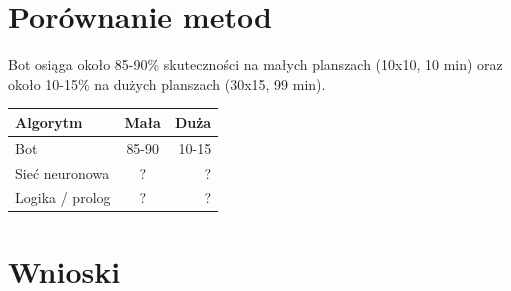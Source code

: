 \documentclass{article} %
\begin{document}
\section{Porównanie metod}
Bot osiąga około 85-90\% skuteczności na małych planszach (10x10, 10 min) 
oraz około 10-15\% na dużych planszach (30x15, 99 min).
\begin{center} 
    \begin{tabular}  { | l | c | r |   }
        \hline
        Algorytm & Mała & Duża  \\
        \hline
        Bot & 85-90 & 10-15 \\
        \hline
        Sieć neuronowa & ? & ? \\
        \hline
        Logika / prolog & ? & ? \\
        \hline
    \end{tabular}
\end{center}
\section{Wnioski}
\end{document}
